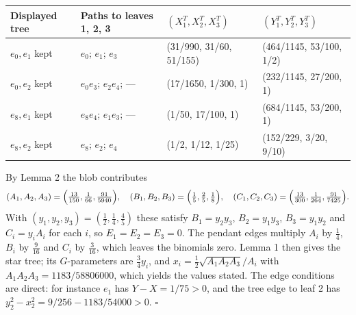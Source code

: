 \documentclass[
  11pt,
]{article}
\newcounter{none} %
\begin{document}
{\def\LTcaptype{none} %
\begin{longtable}[]{@{}
  >{\raggedright\arraybackslash}p{}
  >{\raggedright\arraybackslash}p{}
  >{\raggedright\arraybackslash}p{}
  >{\raggedright\arraybackslash}p{}@{}}
\toprule\noalign{}
\begin{minipage}[b]{\linewidth}\raggedright
Displayed tree
\end{minipage} & \begin{minipage}[b]{\linewidth}\raggedright
Paths to leaves 1, 2, 3
\end{minipage} & \begin{minipage}[b]{\linewidth}\raggedright
\((X_1^T, X_2^T, X_3^T)\)
\end{minipage} & \begin{minipage}[b]{\linewidth}\raggedright
\((Y_1^T, Y_2^T, Y_3^T)\)
\end{minipage} \\
\midrule\noalign{}
\endhead
\bottomrule\noalign{}
\endlastfoot
\(e_0, e_1\) kept & \(e_0\); \(e_1\); \(e_3\) & (31/990, 31/60, 51/155)
& (464/1145, 53/100, 1/2) \\
\(e_0, e_2\) kept & \(e_0e_3\); \(e_2e_4\); --- & (17/1650, 1/300, 1) &
(232/1145, 27/200, 1) \\
\(e_8, e_1\) kept & \(e_8e_4\); \(e_1e_3\); --- & (1/50, 17/100, 1) &
(684/1145, 53/200, 1) \\
\(e_8, e_2\) kept & \(e_8\); \(e_2\); \(e_4\) & (1/2, 1/12, 1/25) &
(152/229, 3/20, 9/10) \\
\end{longtable}
}

By Lemma 2 the blob contributes
\[(A_1,A_2,A_3)=\Bigl(\tfrac{13}{150},\tfrac{1}{66},\tfrac{91}{5940}\Bigr),\quad (B_1,B_2,B_3)=\Bigl(\tfrac15,\tfrac25,\tfrac18\Bigr),\quad (C_1,C_2,C_3)=\Bigl(\tfrac{13}{300},\tfrac{1}{264},\tfrac{91}{7425}\Bigr).\]
With \((y_1,y_2,y_3)=(\tfrac12,\tfrac14,\tfrac45)\) these satisfy
\(B_1=y_2y_3\), \(B_2=y_1y_3\), \(B_3=y_1y_2\) and \(C_i = y_iA_i\) for
each \(i\), so \(E_1=E_2=E_3=0\). The pendant edges multiply \(A_i\) by
\(\tfrac14\), \(B_i\) by \(\tfrac{9}{16}\) and \(C_i\) by
\(\tfrac{3}{16}\), which leaves the binomials zero. Lemma 1 then gives
the star tree; its \(G\)-parameters are \(\tfrac34 y_i\), and
\(x_i = \tfrac12\sqrt{A_1A_2A_3}/A_i\) with
\(A_1A_2A_3 = 1183/58806000\), which yields the values stated. The edge
conditions are direct: for instance \(e_1\) has \(Y-X = 1/75 > 0\), and
the tree edge to leaf 2 has \(y_2^2 - x_2^2 = 9/256 - 1183/54000 > 0\).
\(\square\)
\end{document}
